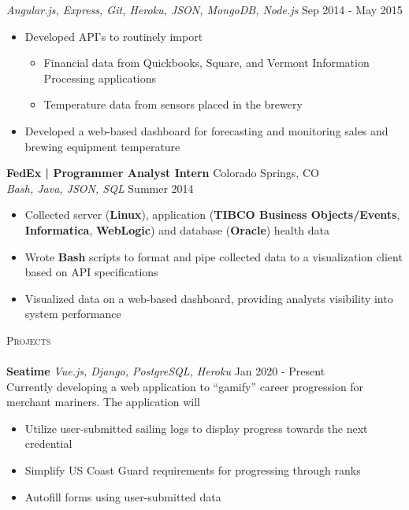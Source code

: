 \documentclass[a4paper]{article}
\newcommand{\lineunder} {
    \vspace*{-8pt} \\
    \hspace*{-18pt} \hrulefill \\
}
\newcommand{\header} [1] {
    {\hspace*{-18pt}\vspace*{6pt} \textsc{#1}}
    \vspace*{-6pt} \lineunder
}
\begin{document}
\textsl{Angular.js, Express, Git, Heroku, JSON, MongoDB, Node.js} \hfill Sep 2014 - May 2015\\
\vspace{-1mm}
\begin{itemize} \itemsep 1pt
	\item  Developed API’s to routinely import 
	\begin{itemize} \itemsep 1pt
		\item Financial data from Quickbooks, Square, and Vermont Information Processing applications 
		\item Temperature data from sensors placed in the brewery
	\end{itemize}
	\item  Developed a web-based dashboard for forecasting and monitoring sales and brewing equipment temperature
\end{itemize}
\textbf{FedEx | Programmer Analyst Intern} \hfill Colorado Springs, CO\\
\textsl{Bash, Java, JSON, SQL} \hfill Summer 2014\\
\vspace{-1mm}
\begin{itemize} \itemsep 1pt
	\item  Collected server (\textbf{Linux}), application (\textbf{TIBCO Business Objects/Events}, \textbf{Informatica}, \textbf{WebLogic}) and database (\textbf{Oracle}) health data
	\item  Wrote \textbf{Bash} scripts to format and pipe collected data to a visualization client based on API specifications
	\item  Visualized data on a web-based dashboard, providing analysts visibility into system performance
\end{itemize}



\header{Projects}
\textbf{Seatime} \hfill
\textsl{Vue.js, Django, PostgreSQL, Heroku} \hfill Jan 2020 - Present\\
\vspace{2mm}
Currently developing a web application to “gamify” career progression for merchant mariners. The application will 
\begin{itemize} \itemsep 1pt
	\item  Utilize user-submitted sailing logs to display progress towards the next credential 
	\item  Simplify US Coast Guard requirements for progressing through ranks 
	\item Autofill forms using user-submitted data
\end{itemize}
\vspace*{2mm}



\ 
\end{document}
